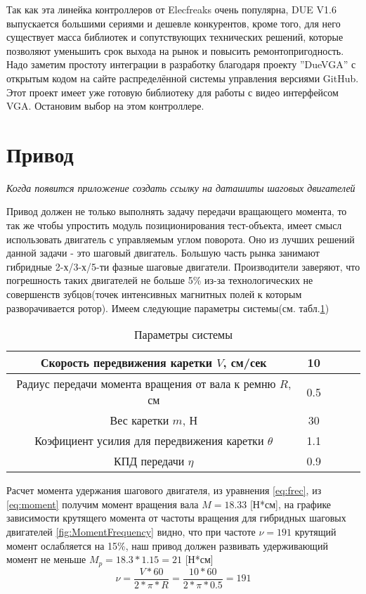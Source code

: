 Так как эта линейка контроллеров от Elecfreaks очень популярна, DUE V1.6 выпускается большими сериями и дешевле конкурентов, кроме того, для него существует масса библиотек и сопутствующих технических решений, которые позволяют уменьшить срок выхода на рынок и повысить ремонтопригодность. Надо заметим простоту интеграции в разработку благодаря проекту ''DueVGA'' с открытым кодом на сайте распределённой системы управления версиями GitHub\cite{s_2}. Этот проект имеет уже готовую библиотеку для работы с видео интерфейсом VGA. Остановим выбор на этом контроллере.

\section{Привод}
\textit{Когда появится приложение создать ссылку на даташиты шаговых двигателей}

Привод должен не только выполнять задачу передачи вращающего момента, то так же чтобы упростить модуль позиционирования тест-объекта, имеет смысл использовать двигатель с управляемым углом поворота. Оно из лучших решений данной задачи - это шаговый двигатель. Большую часть рынка занимают гибридные 2-х/3-х/5-ти фазные шаговые двигатели. Производители заверяют, что погрешность таких двигателей не больше 5\% из-за технологических не совершенств зубцов(точек интенсивных магнитных полей к которым разворачивается ротор).
Имеем следующие параметры системы(см. табл.\ref{tab:MechParamSys})

\begin{table}[ht]
\centering
\begin{tabular}{|c|c|c|c|c|}
\hline 
Скорость передвижения каретки $V$, см/сек & 10\\
\hline 
Радиус передачи момента вращения от вала к ремню $R$, см & 0.5\\
\hline 
Вес каретки $m$, Н & 30\\
\hline 
Коэфициент усилия для передвижения каретки $\theta$ & 1.1\\
\hline 
КПД передачи $\eta$ & 0.9 \\
\hline 

\end{tabular} 
\caption{Параметры системы}
\label{tab:MechParamSys}
\end{table}
Расчет момента удержания шагового двигателя, из уравнения \ref{eq:frec}, из \ref{eq:moment} получим момент вращения вала $M=18.33$ [Н*см], на графике зависимости крутящего момента от частоты вращения для гибридных шаговых двигателей \ref{fig:MomentFrequency} видно, что при частоте $\nu=191$ крутящий момент ослабляется на 15\%, наш привод должен развивать удерживающий момент не меньше $M_{p}=18.3*1.15=21$ [Н*см]
\begin{equation}
\label{eq:frec}
\nu =\frac{V*60}{2*\pi*R}= \frac{10*60}{2*\pi*0.5}=191
\end{equation}

